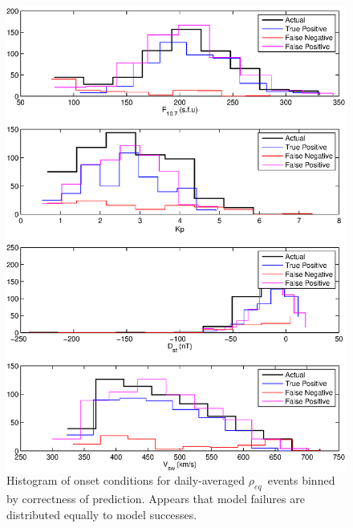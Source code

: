 \documentclass[xcolor={dvipsnames,table}]{beamer}
\newcommand{\req}{\ensuremath{\rho_{eq}}} %
\begin{document}
\begin{frame}
	\begin{figure}[htp!]
		\centering
		\begin{columns}
		\includegraphics[width=0.85\linewidth]{Figures/CH5/NNBinaryOnset-daily-hist.eps}
		\caption{Histogram of onset conditions for daily-averaged \req\ events binned by correctness of prediction. Appears that model failures are distributed equally to model successes.}
		\end{columns}
		\label{fig:OnsetEventsHist}
	\end{figure}
\end{frame}
\end{document}
